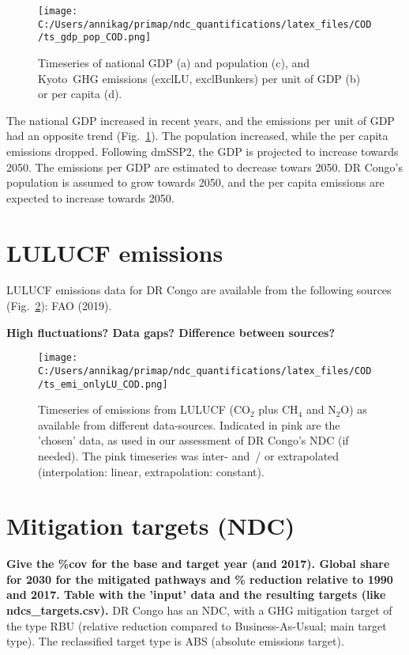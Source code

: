 \documentclass[12pt]{article}
\begin{document}
 \begin{figure}[H]
 \centering
 \texttt{[image: C:/Users/annikag/primap/ndc\_quantifications/latex\_files/COD/ts\_gdp\_pop\_COD.png]}
 \caption{Timeseries of national GDP (a) and population (c), and Kyoto~GHG emissions (exclLU, exclBunkers) per unit of GDP (b) or per capita (d).}
 \label{fig:tsSocioEco}
 \end{figure}

 The national GDP increased in recent years, and the emissions per unit of GDP had an opposite trend (Fig.~\ref{fig:tsSocioEco}).
 The population increased, while the per capita emissions dropped. 
 Following dmSSP2, the GDP is projected to increase towards 2050. 
 The emissions per GDP are estimated to decrease towars 2050. 
 DR Congo's population is assumed to grow towards 2050, and the per capita emissions are expected to increase towards 2050. 

 \newpage %
 \section{LULUCF emissions}
 \label{sec:emiLULUCF}
 LULUCF emissions data for DR Congo are available from the following sources (Fig.~\ref{fig:tsLULUCF}): FAO (2019).

 \textbf{High fluctuations? Data gaps? Difference between sources?}

 \begin{figure}[H]
 \centering
 \texttt{[image: C:/Users/annikag/primap/ndc\_quantifications/latex\_files/COD/ts\_emi\_onlyLU\_COD.png]}
 \caption{Timeseries of emissions from LULUCF (CO$_2$ plus CH$_4$ and N$_2$O) as available from different data-sources. 
 Indicated in pink are the 'chosen' data, as used in our assessment of DR Congo's NDC (if needed). 
 The pink timeseries was inter- and~/ or extrapolated (interpolation: linear, extrapolation: constant).}
 \label{fig:tsLULUCF}
 \end{figure}

 \newpage %
 \section{Mitigation targets (NDC)}
 \label{sec:mitiTars}

 \textbf{ 
 Give the \%cov for the base and target year (and 2017).
 Global share for 2030 for the mitigated pathways and \% reduction relative to 1990 and 2017.
 Table with the 'input' data and the resulting targets (like ndcs\_targets.csv).}
 DR Congo has an NDC, with a GHG mitigation target of the type RBU (relative reduction compared to Business-As-Usual; main target type).
 The reclassified target type is ABS (absolute emissions target).
\end{document}

